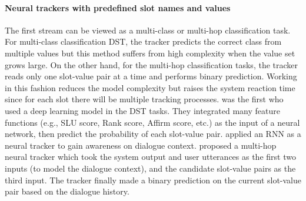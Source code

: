 \paragraph*{Neural trackers with predefined slot names and values} The first stream can be viewed as a multi-class or multi-hop classification task. For multi-class classification DST, the tracker predicts the correct class from multiple values but this method suffers from high complexity when the value set grows large. On the other hand, for the multi-hop classification tasks, the tracker reads only one slot-value pair at a time and performs binary prediction. Working in this fashion reduces the model complexity but raises the system reaction time since for each slot there will be multiple tracking processes.  was the first who used a deep learning model in the DST tasks. They integrated many feature functions (e.g., SLU score, Rank score, Affirm score, etc.) as the input of a neural network, then predict the probability of each slot-value pair.  applied an RNN as a neural tracker to gain awareness on dialogue context.  proposed a multi-hop neural tracker which took the system output and user utterances as the first two inputs (to model the dialogue context), and the candidate slot-value pairs as the third input. The tracker finally made a binary prediction on the current slot-value pair based on the dialogue history. 
